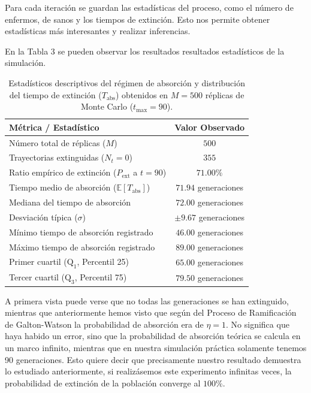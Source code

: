 \documentclass[graybox]{SNmult}
\begin{document}
	
	Para cada iteración se guardan las estadísticas del proceso, como el número de enfermos, de sanos y los tiempos de extinción. Esto nos permite obtener estadísticas más interesantes y realizar inferencias. 
	
	En la Tabla 3 se pueden observar los resultados resultados estadísticos de la simulación. 
	
	\begin{table}[htbp]
		\caption{Estadísticos descriptivos del régimen de absorción y distribución del tiempo de extinción ($T_{\text{abs}}$) obtenidos en $M = 500$ réplicas de Monte Carlo ($t_{\max} = 90$).}
		\label{tab:resultados_monte_carlo}
		\centering
		\begin{tabular}{lc}
			\hline
			\textbf{Métrica / Estadístico} & \textbf{Valor Observado} \\
			\hline
			Número total de réplicas ($M$) & $500$ \\
			Trayectorias extinguidas ($N_t = 0$) & $355$ \\
			Ratio empírico de extinción ($P_{\text{ext}}$ a $t=90$) & $71.00\%$ \\
			\hline
			Tiempo medio de absorción ($\mathbb{E}[T_{\text{abs}}]$) & $71.94$ generaciones \\
			Mediana del tiempo de absorción & $72.00$ generaciones \\
			Desviación típica ($\sigma$) & $\pm 9.67$ generaciones \\
			Mínimo tiempo de absorción registrado & $46.00$ generaciones \\
			Máximo tiempo de absorción registrado & $89.00$ generaciones \\
			Primer cuartil ($\text{Q}_1$, Percentil 25) & $65.00$ generaciones \\
			Tercer cuartil ($\text{Q}_3$, Percentil 75) & $79.50$ generaciones \\
			\hline
		\end{tabular}
	\end{table}
	
	A primera vista puede verse que no todas las generaciones se han extinguido, mientras que anteriormente hemos visto que según del Proceso de Ramificación de Galton-Watson la probabilidad de absorción era de $\eta = 1$. No significa que haya habido un error, sino que la probabilidad de absorción teórica se calcula en un marco infinito, mientras que en nuestra simulación práctica solamente tenemos 90 generaciones. Esto quiere decir que precisamente nuestro resultado demuestra lo estudiado anteriormente, si realizásemos este experimento infinitas veces, la probabilidad de extinción de la población converge al $100\%$. 
	
\end{document}
